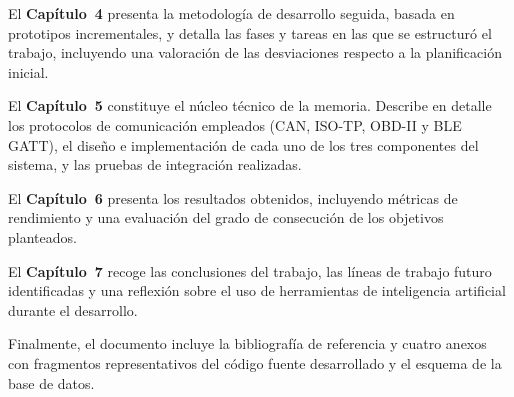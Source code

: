 El \textbf{Capítulo~4} presenta la metodología de desarrollo seguida, basada en prototipos incrementales, y detalla las fases y tareas en las que se estructuró el trabajo, incluyendo una valoración de las desviaciones respecto a la planificación inicial.

El \textbf{Capítulo~5} constituye el núcleo técnico de la memoria. Describe en detalle los protocolos de comunicación empleados (CAN, ISO-TP, OBD-II y BLE GATT), el diseño e implementación de cada uno de los tres componentes del sistema, y las pruebas de integración realizadas.

El \textbf{Capítulo~6} presenta los resultados obtenidos, incluyendo métricas de rendimiento y una evaluación del grado de consecución de los objetivos planteados.

El \textbf{Capítulo~7} recoge las conclusiones del trabajo, las líneas de trabajo futuro identificadas y una reflexión sobre el uso de herramientas de inteligencia artificial durante el desarrollo.

Finalmente, el documento incluye la bibliografía de referencia y cuatro anexos con fragmentos representativos del código fuente desarrollado y el esquema de la base de datos.
